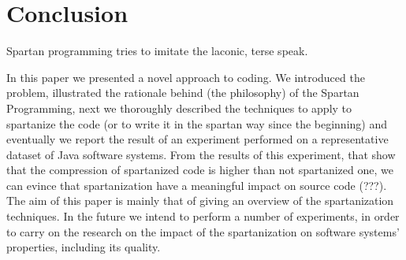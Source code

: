 \section{Conclusion}
Spartan programming tries to imitate the laconic, terse speak.  
\label{Conclusion}

In this paper we presented a novel approach to coding. We introduced the
problem, illustrated the rationale behind (the philosophy) of the Spartan
Programming, next we thoroughly described the techniques to apply to spartanize
the code (or to write it in the spartan way since the beginning) and eventually
we report the result of an experiment performed on a representative dataset of
Java software systems.  From the results of this experiment, that show that the
compression of spartanized code is higher than not spartanized one, we can
evince that spartanization have a meaningful impact on source code (???).  The
aim of this paper is mainly that of giving an overview of the spartanization
techniques.  In the future we intend to perform a number of experiments, in
order to carry on the research on the impact of the spartanization on software
systems' properties, including its quality.

